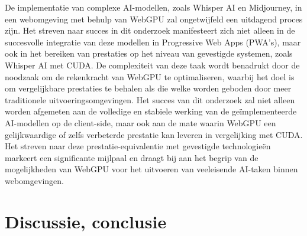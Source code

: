 \documentclass{hogent-article}
\begin{document}
De implementatie van complexe AI-modellen, zoals Whisper AI en Midjourney, 
in een webomgeving met behulp van WebGPU zal ongetwijfeld een uitdagend proces zijn. 
Het streven naar succes in dit onderzoek manifesteert zich niet alleen in de succesvolle integratie van deze modellen in Progressive Web Apps (PWA's), 
maar ook in het bereiken van prestaties op het niveau van gevestigde systemen, zoals Whisper AI met CUDA. 
De complexiteit van deze taak wordt benadrukt door de noodzaak om de rekenkracht van WebGPU te optimaliseren, 
waarbij het doel is om vergelijkbare prestaties te behalen als die welke worden geboden door meer traditionele uitvoeringsomgevingen. 
Het succes van dit onderzoek zal niet alleen worden afgemeten aan de volledige en stabiele werking van de geïmplementeerde AI-modellen op de client-side, 
maar ook aan de mate waarin WebGPU een gelijkwaardige of zelfs verbeterde prestatie kan leveren in vergelijking met CUDA. 
Het streven naar deze prestatie-equivalentie met gevestigde technologieën markeert een significante mijlpaal 
en draagt bij aan het begrip van de mogelijkheden van WebGPU voor het uitvoeren van veeleisende AI-taken binnen webomgevingen.

\section{Discussie, conclusie}

\label{sec:discussie-conclusie}



\printbibliography
\end{document}

